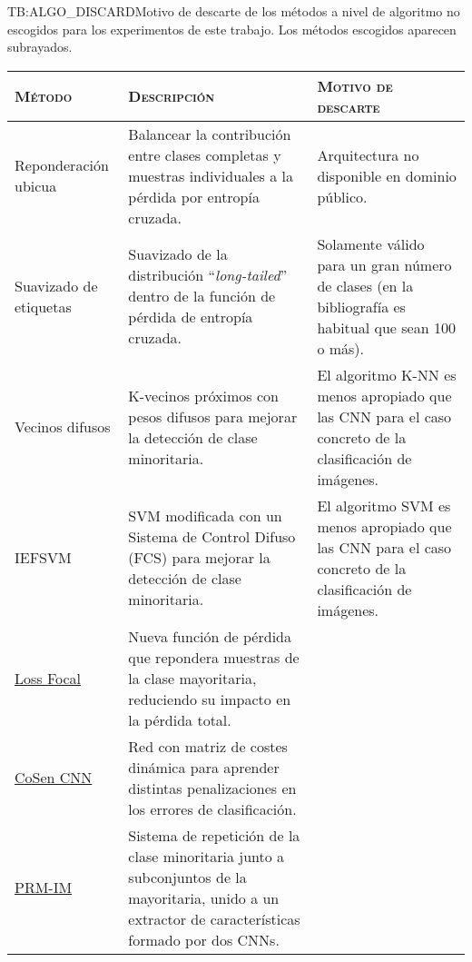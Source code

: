 \begin{table}[Motivo de descarte - métodos a nivel de algoritmo]{TB:ALGO_DISCARD}{Motivo de descarte de los métodos a nivel de algoritmo no escogidos para los experimentos de este trabajo. Los métodos escogidos aparecen subrayados.}
    \small
    \hskip-3.0cm\begin{tabular}{|l|p{6.5cm}|p{6.5cm}|}
        \hline
        \textsc{Método} & \textsc{Descripción} & \textsc{Motivo de descarte} \\
        \hline
        Reponderación ubicua \cite{li2019learning} & Balancear la contribución entre clases completas y muestras individuales a la pérdida por entropía cruzada. & Arquitectura no disponible en dominio público. \\ \hline
        Suavizado de etiquetas \cite{zhong2021improving} & Suavizado de la distribución ``\textit{long-tailed}'' dentro de la función de pérdida de entropía cruzada. & Solamente válido para un gran número de clases (en la bibliografía es habitual que sean 100 o más). \\ \hline
        Vecinos difusos \cite{patel2017classification} & K-vecinos próximos con pesos difusos para mejorar la detección de clase minoritaria. & El algoritmo K-NN es menos apropiado que las CNN para el caso concreto de la clasificación de imágenes. \\ \hline
        IEFSVM \cite{cho2020instance} & SVM modificada con un Sistema de Control Difuso (FCS) para mejorar la detección de clase minoritaria. & El algoritmo SVM es menos apropiado que las CNN para el caso concreto de la clasificación de imágenes. \\ \hline

        
        \underline{Loss Focal} \cite{lin2017focal} & Nueva función de pérdida que repondera muestras de la clase mayoritaria, reduciendo su impacto en la pérdida total. & \\ \hline
        \underline{CoSen CNN} \cite{khan2017cost} & Red con matriz de costes dinámica para aprender distintas penalizaciones en los errores de clasificación. & \\ \hline
        \underline{PRM-IM} \cite{liu2022solving} & Sistema de repetición de la clase minoritaria junto a subconjuntos de la mayoritaria, unido a un extractor de características formado por dos CNNs. & \\ \hline
    \end{tabular}
\end{table}

